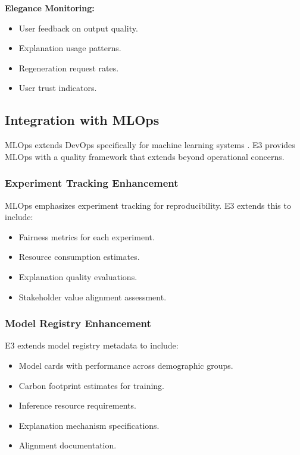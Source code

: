 \documentclass[11pt,a4paper]{article}
\begin{document}
\textbf{Elegance Monitoring:}
\begin{itemize}[leftmargin=2em]
    \item User feedback on output quality.
    \item Explanation usage patterns.
    \item Regeneration request rates.
    \item User trust indicators.
\end{itemize}

\subsection{Integration with MLOps}

MLOps extends DevOps specifically for machine learning systems \cite{sridhar2022mlops}. E3 provides MLOps with a quality framework that extends beyond operational concerns.

\subsubsection{Experiment Tracking Enhancement}

MLOps emphasizes experiment tracking for reproducibility. E3 extends this to include:

\begin{itemize}[leftmargin=2em]
    \item Fairness metrics for each experiment.
    \item Resource consumption estimates.
    \item Explanation quality evaluations.
    \item Stakeholder value alignment assessment.
\end{itemize}

\subsubsection{Model Registry Enhancement}

E3 extends model registry metadata to include:

\begin{itemize}[leftmargin=2em]
    \item Model cards with performance across demographic groups.
    \item Carbon footprint estimates for training.
    \item Inference resource requirements.
    \item Explanation mechanism specifications.
    \item Alignment documentation.
\end{itemize}
\end{document}
